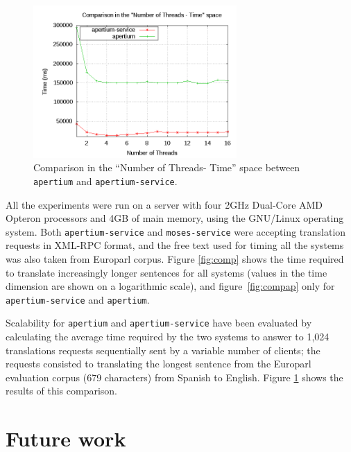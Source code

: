 \documentclass[11pt]{article}
\begin{document}
\begin{figure}[!ht]
\begin{center}
\includegraphics[width=7.75cm]{compmt}
\end{center}
\caption{Comparison in the ``Number of Threads- Time'' space between {\tt apertium} and {\tt apertium-service}.}
\label{fig:compmt}
\end{figure}

All the experiments were run on a server with four 2GHz Dual-Core AMD Opteron processors and 4GB of main 
memory, using the GNU/Linux operating system. Both {\tt\small apertium-service} and {\tt\small moses-service} 
were accepting translation requests in XML-RPC format, and the free text used for timing all the systems 
was also taken from Europarl corpus. Figure \ref{fig:comp} shows the time required to translate increasingly 
longer sentences for all systems (values in the time dimension are shown on a logarithmic scale), and 
figure~\ref{fig:compap} only for {\tt\small apertium-service} and {\tt\small apertium}.

Scalability for {\tt\small apertium} and {\tt\small apertium-service} have been evaluated by calculating the 
average time required by the two systems to answer to 1,024 translations requests sequentially sent by a 
variable number of clients; the requests consisted to translating the longest sentence from the Europarl 
evaluation corpus (679 characters) from Spanish to English. Figure \ref{fig:compmt} shows the results of 
this comparison.



\section{Future work}
\end{document}
